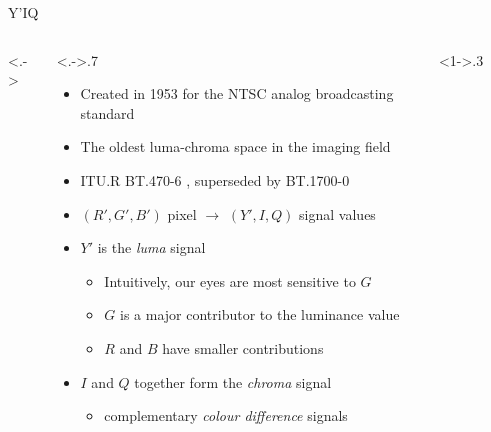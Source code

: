 \documentclass[aspectratio=169,handout,usepdftitle=false]{fireshonks}
\begin{document}
\begin{frame}{Y'IQ}
    \begin{columns}<.->
        \begin{column}<.->{.7\textwidth}
            \begin{itemize}
                \item Created in 1953 for the NTSC analog broadcasting standard
                \item The oldest luma-chroma space in the imaging field
                \item ITU.R BT.470-6 \parencite*{BT470}, superseded by BT.1700-0 \parencite*{BT1700}
                \item $(R', G', B')$ pixel $\rightarrow$ $(Y', I, Q)$ signal values
                \item $Y'$ is the \emph{luma} signal
                      \begin{itemize}
                          \item Intuitively, our eyes are most sensitive to $G$
                          \item $G$ is a major contributor to the luminance value
                          \item $R$ and $B$ have smaller contributions
                      \end{itemize}
                \item $I$ and $Q$ together form the \emph{chroma} signal
                      \begin{itemize}
                          \item complementary \emph{colour difference} signals
                      \end{itemize}
            \end{itemize}
        \end{column}
        \begin{column}<1->{.3\textwidth}
            \begin{figure}

\end{figure}
\end{column}
\end{columns}
\end{frame}
\end{document}
